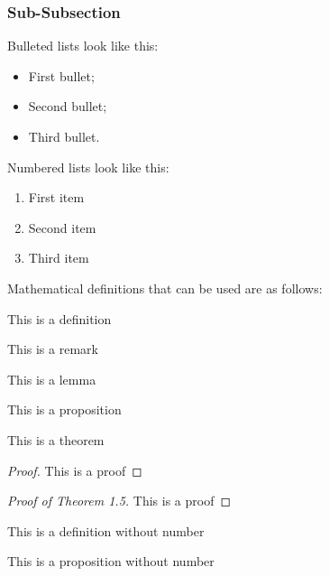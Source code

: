\documentclass[referee,usenatbib]{ijmathtex}
\newcommand{\inspace}[1]{\vspace*{#1}\noindent}
\begin{document}
\subsubsection{Sub-Subsection}

\inspace{2mm}%
Bulleted lists look like this:
\begin{itemize}
	\item First bullet; 
	\item Second bullet;
	\item Third bullet.
\end{itemize}

\noindent Numbered lists look like this:
\begin{enumerate}
	\item First item
	\item Second item
	\item Third item
\end{enumerate}

\inspace{3mm}%
Mathematical definitions that can be used are as follows:
\begin{definition}
	This is a definition
\end{definition}

\begin{remark}
	This is a remark
\end{remark}

\begin{lemma}
	This is a  lemma
\end{lemma}

\begin{proposition}
	This is a proposition
\end{proposition}

\begin{theorem}
	This is a theorem
\end{theorem}

\begin{proof}
	This is a proof
\end{proof}

\begin{proof}[Proof of Theorem 1.5]
	This is a proof
\end{proof}

\begin{definition*}
	This is a definition without number
\end{definition*}

\begin{proposition*}
	This is a proposition without number
\end{proposition*}
\end{document}
